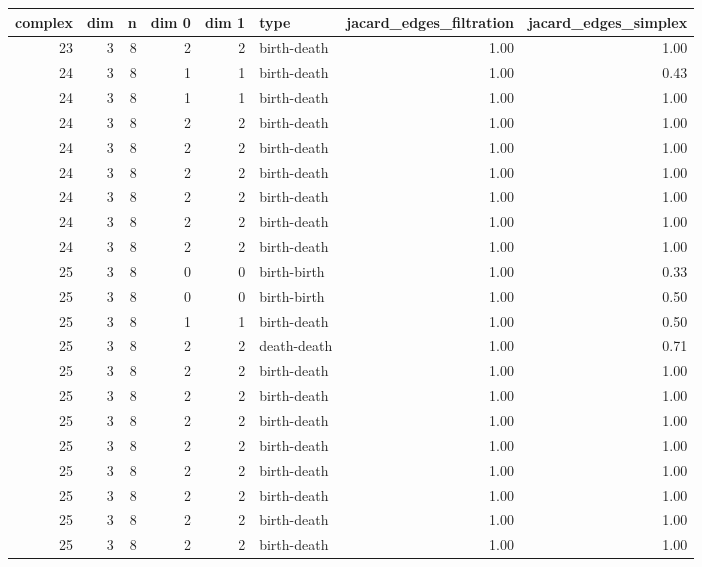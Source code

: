 \documentclass{article}
\begin{document}
\begin{center}
\begin{tabular}{rrrrrlrr}
\toprule
complex & dim & n & dim 0 & dim 1 & type & jacard\_edges\_filtration & jacard\_edges\_simplex \\
\midrule
23 & 3 & 8 & 2 & 2 & birth-death & 1.00 & 1.00 \\
24 & 3 & 8 & 1 & 1 & birth-death & 1.00 & 0.43 \\
24 & 3 & 8 & 1 & 1 & birth-death & 1.00 & 1.00 \\
24 & 3 & 8 & 2 & 2 & birth-death & 1.00 & 1.00 \\
24 & 3 & 8 & 2 & 2 & birth-death & 1.00 & 1.00 \\
24 & 3 & 8 & 2 & 2 & birth-death & 1.00 & 1.00 \\
24 & 3 & 8 & 2 & 2 & birth-death & 1.00 & 1.00 \\
24 & 3 & 8 & 2 & 2 & birth-death & 1.00 & 1.00 \\
24 & 3 & 8 & 2 & 2 & birth-death & 1.00 & 1.00 \\
25 & 3 & 8 & 0 & 0 & birth-birth & 1.00 & 0.33 \\
25 & 3 & 8 & 0 & 0 & birth-birth & 1.00 & 0.50 \\
25 & 3 & 8 & 1 & 1 & birth-death & 1.00 & 0.50 \\
25 & 3 & 8 & 2 & 2 & death-death & 1.00 & 0.71 \\
25 & 3 & 8 & 2 & 2 & birth-death & 1.00 & 1.00 \\
25 & 3 & 8 & 2 & 2 & birth-death & 1.00 & 1.00 \\
25 & 3 & 8 & 2 & 2 & birth-death & 1.00 & 1.00 \\
25 & 3 & 8 & 2 & 2 & birth-death & 1.00 & 1.00 \\
25 & 3 & 8 & 2 & 2 & birth-death & 1.00 & 1.00 \\
25 & 3 & 8 & 2 & 2 & birth-death & 1.00 & 1.00 \\
25 & 3 & 8 & 2 & 2 & birth-death & 1.00 & 1.00 \\
25 & 3 & 8 & 2 & 2 & birth-death & 1.00 & 1.00 \\
\bottomrule
\end{tabular}
\end{center}
\end{document}
